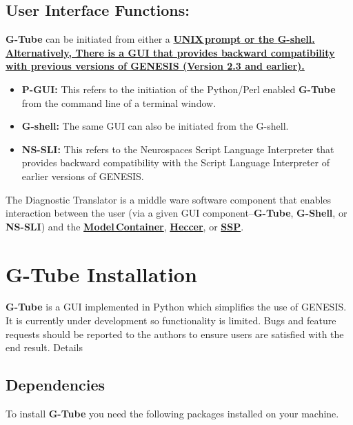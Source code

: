 \documentclass[12pt]{article}
\begin{document}
\subsection*{User Interface Functions:} {\bf G-Tube} can be initiated from either a \href{../unix-linux/unix-linux.tex}\bf {\bf UNIX\,prompt} or the \href{../gshell/gshell.tex}{\bf G-shell}. Alternatively, There is a GUI that provides backward compatibility with previous versions of GENESIS (Version 2.3 and earlier).

\begin{itemize}
   \item {\bf P-GUI:} This refers to the initiation of the Python/Perl enabled {\bf G-Tube} from the command line of a terminal window.
   \item {\bf G-shell:} The same GUI can also be initiated from the G-shell.
   \item {\bf NS-SLI:} This refers to the Neurospaces Script Language Interpreter that provides backward compatibility with the Script Language Interpreter of earlier versions of GENESIS.
\end{itemize}

The Diagnostic Translator is a middle ware software component that enables interaction between the user (via a given GUI component--{\bf G-Tube}, {\bf G-Shell}, or {\bf NS-SLI}) and the \href{../model-container/model-container.tex}{\bf Model\,Container}, \href{../heccer/heccer.tex}{\bf Heccer}, or \href{../ssp/ssp.tex}{\bf SSP}.

\section*{G-Tube Installation}

{\bf G-Tube} is a GUI implemented in Python which simplifies the use of GENESIS. It is currently under development so functionality is limited. Bugs and feature requests should be reported to the authors to ensure users are satisfied with the end result.
Details

\subsection*{Dependencies}

To install {\bf G-Tube} you need the following packages installed on your machine.
\end{document}
